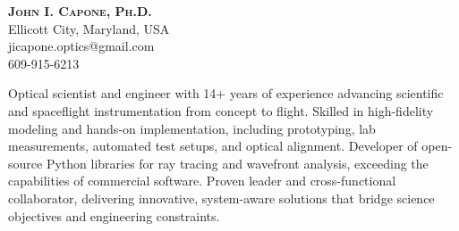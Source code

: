 \documentclass[letterpaper,11pt]{article}
\begin{document}
\begin{center}
    \textbf{\Huge \scshape John I. Capone, Ph.D.} \\ \vspace{1pt}
    \small Ellicott City, Maryland, USA \\ \vspace{1pt}
    \small jicapone.optics@gmail.com \\ \vspace{1pt}
    \small  609-915-6213\\ \vspace{2pt}
\end{center}

\begin{adjustwidth}{50pt}{50pt}
\raggedright
\small Optical scientist and engineer with 14+ years of experience advancing scientific and spaceflight instrumentation from concept to flight. Skilled in high-fidelity modeling and hands-on implementation, including prototyping, lab measurements, automated test setups, and optical alignment. Developer of open-source Python libraries for ray tracing and wavefront analysis, exceeding the capabilities of commercial software. Proven leader and cross-functional collaborator, delivering innovative, system-aware solutions that bridge science objectives and engineering constraints.
\end{adjustwidth}

\end{document}
